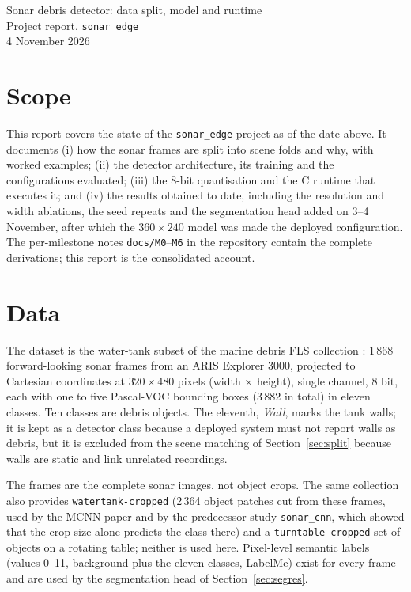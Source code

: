 \documentclass[11pt,a4paper]{article}
\begin{document}
\begin{center}
  {\LARGE Sonar debris detector: data split, model and runtime}\\[0.6em]
  {\large Project report, \texttt{sonar\_edge}}\\[0.3em]
  4 November 2026
\end{center}
\vspace{0.5em}

\section*{Scope}

This report covers the state of the \texttt{sonar\_edge} project as of the
date above. It documents (i) how the sonar frames are split into scene folds
and why, with worked examples; (ii) the detector architecture, its training
and the configurations evaluated; (iii) the 8-bit quantisation and the C
runtime that executes it; and (iv) the results obtained to date, including
the resolution and width ablations, the seed repeats and the segmentation
head added on 3--4 November, after which the $360 \times 240$ model was made
the deployed configuration. The per-milestone
notes \texttt{docs/M0}--\texttt{M6} in the repository contain the complete
derivations; this report is the consolidated account.

\tableofcontents

\section{Data}
\label{sec:data}

The dataset is the water-tank subset of the marine debris FLS collection
\cite{valdenegro2025}: 1\,868 forward-looking sonar frames from an ARIS
Explorer 3000, projected to Cartesian coordinates at $320 \times 480$ pixels
(width $\times$ height), single channel, 8 bit, each with one to five
Pascal-VOC bounding boxes (3\,882 in total) in eleven classes. Ten classes
are debris objects. The eleventh, \emph{Wall}, marks the tank walls; it is
kept as a detector class because a deployed system must not report walls as
debris, but it is excluded from the scene matching of
Section~\ref{sec:split} because walls are static and link unrelated
recordings.

The frames are the complete sonar images, not object crops. The same
collection also provides \texttt{watertank-cropped} (2\,364 object patches cut
from these frames, used by the MCNN paper and by the predecessor study
\texttt{sonar\_cnn}, which showed that the crop size alone predicts the class
there) and a \texttt{turntable-cropped} set of objects on a rotating table;
neither is used here. Pixel-level semantic labels (values 0--11, background
plus the eleven classes, LabelMe) exist for every frame and are used by the segmentation head of
Section~\ref{sec:segres}.
\end{document}
